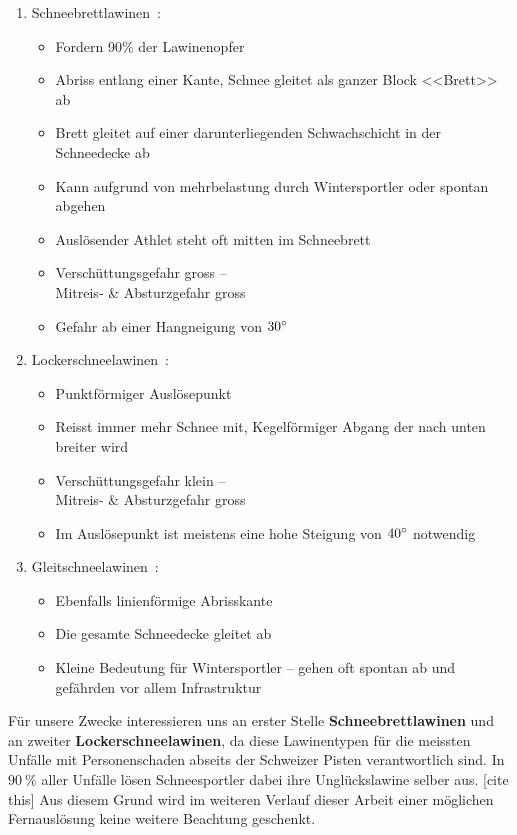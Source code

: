 \begin{enumerate}
  \item Schneebrettlawinen~\cite{sacbergspwinter}\cite{slfLawinentypen}:
  \begin{itemize}
    \item Fordern 90\% der Lawinenopfer
    \item Abriss entlang einer Kante, Schnee gleitet als ganzer Block <<Brett>> ab
    \item Brett gleitet auf einer darunterliegenden Schwachschicht in der Schneedecke ab
    \item Kann aufgrund von mehrbelastung durch Wintersportler oder spontan abgehen
    \item Auslösender Athlet steht oft mitten im Schneebrett
    \item Verschüttungsgefahr gross –\\ Mitreis- \& Absturzgefahr gross
    \item Gefahr ab einer Hangneigung von $30\degree$
  \end{itemize}
    
  \item Lockerschneelawinen~\cite{sacbergspwinter}\cite{slfLawinentypen}:
  \begin{itemize}
    \item Punktförmiger Auslösepunkt
    \item Reisst immer mehr Schnee mit, Kegelförmiger Abgang der nach unten breiter wird
    \item Verschüttungsgefahr klein –\\ Mitreis- \& Absturzgefahr gross
    \item Im Auslösepunkt ist meistens eine hohe Steigung von $40\degree$ notwendig
  \end{itemize}

  \item Gleitschneelawinen~\cite{sacbergspwinter}\cite{slfLawinentypen}:
  \begin{itemize}
    \item Ebenfalls linienförmige Abrisskante
    \item Die gesamte Schneedecke gleitet ab
    \item Kleine Bedeutung für Wintersportler – gehen oft spontan ab und gefährden vor allem Infrastruktur
  \end{itemize}
\end{enumerate}
Für unsere Zwecke interessieren uns an erster Stelle \textbf{Schneebrettlawinen} und an zweiter \textbf{Lockerschneelawinen}, da diese Lawinentypen für die meissten Unfälle mit Personenschaden abseits der Schweizer Pisten verantwortlich sind. In $\qty{90}{\percent}$ aller Unfälle lösen Schneesportler dabei ihre Unglückslawine selber aus. [cite this] Aus diesem Grund wird im weiteren Verlauf dieser Arbeit einer möglichen Fernauslösung keine weitere Beachtung geschenkt.

